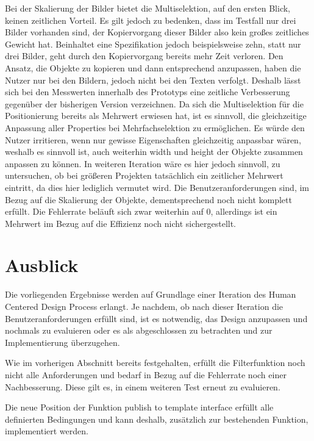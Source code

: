 Bei der Skalierung der Bilder bietet die Multiselektion, auf den ersten Blick, keinen zeitlichen Vorteil.
Es gilt jedoch zu bedenken, dass im Testfall nur drei Bilder vorhanden sind, der Kopiervorgang dieser Bilder also kein großes zeitliches Gewicht hat.
Beinhaltet eine Spezifikation jedoch beispielsweise zehn, statt nur drei Bilder, geht durch den Kopiervorgang bereits mehr Zeit verloren.
Den Ansatz, die Objekte zu kopieren und dann entsprechend anzupassen, haben die Nutzer nur bei den Bildern, jedoch nicht bei den Texten verfolgt.
Deshalb lässt sich bei den Messwerten innerhalb des Prototyps eine zeitliche Verbesserung gegenüber der bisherigen Version verzeichnen.
Da sich die Multiselektion für die Positionierung bereits als Mehrwert erwiesen hat, ist es sinnvoll, die gleichzeitige Anpassung aller Properties bei Mehrfachselektion zu ermöglichen.
Es würde den Nutzer irritieren, wenn nur gewisse Eigenschaften gleichzeitig anpassbar wären, weshalb es sinnvoll ist, auch weiterhin width und height der Objekte zusammen anpassen zu können.
In weiteren Iteration wäre es hier jedoch sinnvoll, zu untersuchen, ob bei größeren Projekten tatsächlich ein zeitlicher Mehrwert eintritt, da dies hier lediglich vermutet wird.
Die Benutzeranforderungen sind, im Bezug auf die Skalierung der Objekte, dementsprechend noch nicht komplett erfüllt.
Die Fehlerrate beläuft sich zwar weiterhin auf 0, allerdings ist ein Mehrwert im Bezug auf die Effizienz noch nicht sichergestellt.

\section {Ausblick}
Die vorliegenden Ergebnisse werden auf Grundlage einer Iteration des Human Centered Design Process erlangt.
Je nachdem, ob nach dieser Iteration die Benutzeranforderungen erfüllt sind, ist es notwendig, das Design anzupassen und nochmals zu evaluieren oder es als abgeschlossen zu betrachten und zur Implementierung überzugehen.

Wie im vorherigen Abschnitt bereits festgehalten, erfüllt die Filterfunktion noch nicht alle Anforderungen und bedarf in Bezug auf die Fehlerrate noch einer Nachbesserung.
Diese gilt es, in einem weiteren Test erneut zu evaluieren.

Die neue Position der Funktion \glqq publish to template interface\grqq{} erfüllt alle definierten Bedingungen und kann deshalb, zusätzlich zur bestehenden Funktion, implementiert werden.

